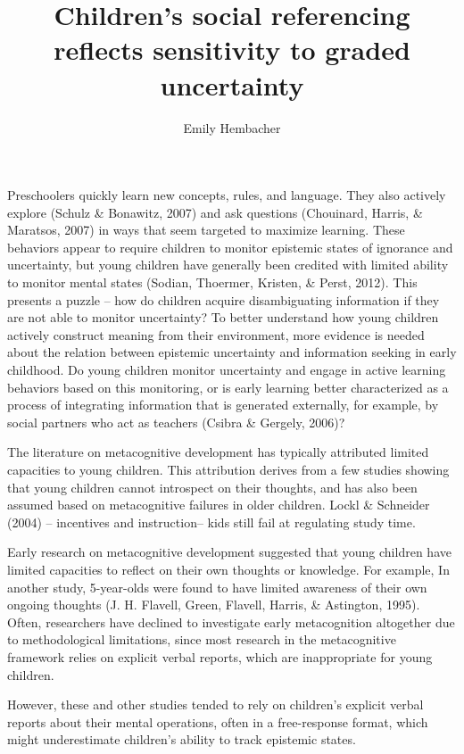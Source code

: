 \documentclass[a4paper,man,apacite,floatsintext]{apa6}
\date{}
\title{\textbf{Children's social referencing reflects sensitivity to graded uncertainty}}
\author{Emily Hembacher}
\affiliation{Department of Psychology, Stanford University}
\begin{document}
\maketitle

Preschoolers quickly learn new concepts, rules, and language. They also
actively explore (Schulz \& Bonawitz, 2007) and ask questions
(Chouinard, Harris, \& Maratsos, 2007) in ways that seem targeted to
maximize learning. These behaviors appear to require children to monitor
epistemic states of ignorance and uncertainty, but young children have
generally been credited with limited ability to monitor mental states
(Sodian, Thoermer, Kristen, \& Perst, 2012). This presents a puzzle --
how do children acquire disambiguating information if they are not able
to monitor uncertainty? To better understand how young children actively
construct meaning from their environment, more evidence is needed about
the relation between epistemic uncertainty and information seeking in
early childhood. Do young children monitor uncertainty and engage in
active learning behaviors based on this monitoring, or is early learning
better characterized as a process of integrating information that is
generated externally, for example, by social partners who act as
teachers (Csibra \& Gergely, 2006)?

The literature on metacognitive development has typically attributed
limited capacities to young children. This attribution derives from a
few studies showing that young children cannot introspect on their
thoughts, and has also been assumed based on metacognitive failures in
older children. Lockl \& Schneider (2004) -- incentives and
instruction-- kids still fail at regulating study time.

Early research on metacognitive development suggested that young
children have limited capacities to reflect on their own thoughts or
knowledge. For example, In another study, 5-year-olds were found to have
limited awareness of their own ongoing thoughts (J. H. Flavell, Green,
Flavell, Harris, \& Astington, 1995). Often, researchers have declined
to investigate early metacognition altogether due to methodological
limitations, since most research in the metacognitive framework relies
on explicit verbal reports, which are inappropriate for young children.

However, these and other studies tended to rely on children's explicit
verbal reports about their mental operations, often in a free-response
format, which might underestimate children's ability to track epistemic
states.
\end{document}

